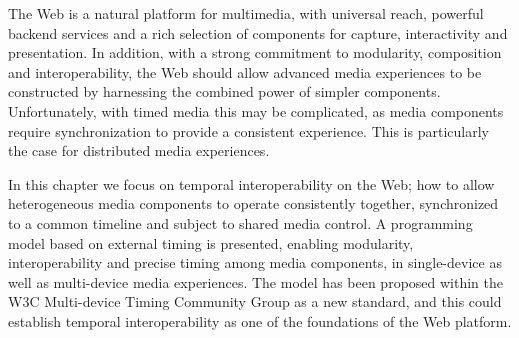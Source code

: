 The Web is a natural platform for multimedia, with universal reach, powerful
backend services and a rich selection of components for capture, interactivity
and presentation. In addition, with a strong commitment to modularity,
composition and interoperability, the Web should allow advanced media
experiences to be constructed by harnessing the combined power of simpler
components. Unfortunately, with timed media this may be complicated, as media
components require synchronization to provide a consistent experience. This is
particularly the case for distributed media experiences.

In this chapter we focus on temporal interoperability on the Web; how to allow
heterogeneous media components to operate consistently together, synchronized
to a common timeline and subject to shared media control. A programming model
based on external timing is presented, enabling modularity, interoperability
and precise timing among media components, in single-device as well as multi-device 
media experiences. The model has been proposed within the W3C Multi-device 
Timing Community Group as a new standard, and this could establish
temporal interoperability as one of the foundations of the Web platform.

